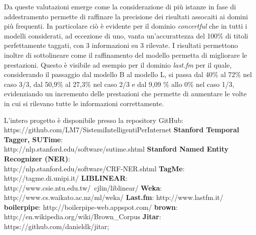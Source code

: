 \documentclass[a4paper]{report}
\begin{document}
Da queste valutazioni emerge come la considerazione di più istanze in fase di addestramento permette di raffinare la precisione dei risultati assocaiti ai domini più frequenti. In particolare ciò è evidente per il dominio \textit{concertful} che in tutti i modelli considerati, ad eccezione di uno, vanta un'accurattezza del 100\% di titoli perfettamente taggati, con 3 informazioni su 3 rilevate. I risultati permettono inoltre di sottolineare come il raffinamento del modello permetta di migliorare le prestazioni. Questo è visibile ad esempio per il dominio \textit{last.fm} per il quale, considerando il passaggio dal modello B al modello L, si passa dal 40\% al 72\% nel caso 3/3, dal 50,9\% al 27,3\% nel caso 2/3 e dal 9,09 \% allo 0\% nel caso 1/3, evidenziando un incremento delle prestazioni che permette di aumentare le volte in cui si rilevano tutte le informazioni correttamente.

\cleardoublepage
\renewcommand\bibname{Riferimenti}
\begin{thebibliography}{n}
\addto\captions{\renewcommand{\thebibliography}{Riferimenti}}
 L'intero progetto è disponibile presso la repository GitHub: \\https://github.com/LM7/SistemiIntelligentiPerInternet
 \textbf{Stanford Temporal Tagger, SUTime}: \\http://nlp.stanford.edu/software/sutime.shtml
 \textbf{Stanford Named Entity Recognizer (NER)}: \\http://nlp.stanford.edu/software/CRF-NER.shtml
 \textbf{TagMe}: http://tagme.di.unipi.it/
 \textbf{LIBLINEAR}: http://www.csie.ntu.edu.tw/~cjlin/liblinear/
 \textbf{Weka}: http://www.cs.waikato.ac.nz/ml/weka/
 \textbf{Last.fm}: http://www.lastfm.it/
 \textbf{boilerpipe}: http://boilerpipe-web.appspot.com/
 \textbf{brown}: http://en.wikipedia.org/wiki/Brown\_Corpus
 \textbf{Jitar}: https://github.com/danieldk/jitar;
\end{thebibliography}
\end{document}
